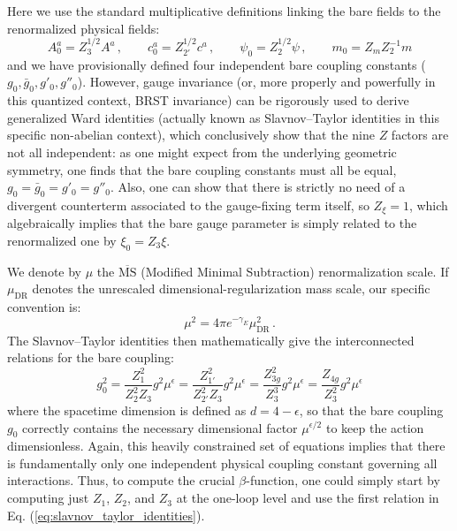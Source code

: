 Here we use the standard multiplicative definitions linking the bare fields to the renormalized physical fields:
\begin{equation} \label{eq:renormalization_constants}
    A_0^a = Z_3^{1/2}A^a \, , \qquad c_0^a = Z_{2'}^{1/2}c^a \, , \qquad \psi_0 = Z_2^{1/2}\psi \, , \qquad m_0 = Z_m Z_2^{-1}m
\end{equation}
and we have provisionally defined four independent bare coupling constants ($g_0, \bar{g}_0, g'_0, g''_0$). However, gauge invariance (or, more properly and powerfully in this quantized context, BRST invariance) can be rigorously used to derive generalized Ward identities (actually known as Slavnov--Taylor identities in this specific non-abelian context), which conclusively show that the nine $Z$ factors are not all independent: as one might expect from the underlying geometric symmetry, one finds that the bare coupling constants must all be equal, $g_0 = \bar{g}_0 = g'_0 = g''_0$. Also, one can show that there is strictly no need of a divergent counterterm associated to the gauge-fixing term itself, so $Z_\xi = 1$, which algebraically implies that the bare gauge parameter is simply related to the renormalized one by $\xi_0 = Z_3\xi$.

We denote by $\mu$ the $\overline{\text{MS}}$ (Modified Minimal Subtraction) renormalization scale. If $\mu_{\text{DR}}$ denotes the unrescaled dimensional-regularization mass scale, our specific convention is:
\begin{equation} \label{eq:ms_bar_scale}
    \mu^2 = 4\pi e^{-\gamma_E} \mu_{\text{DR}}^2 \, .
\end{equation}
The Slavnov--Taylor identities then mathematically give the interconnected relations for the bare coupling:
\begin{equation} \label{eq:slavnov_taylor_identities}
    g_0^2 = \frac{Z_1^2}{Z_2^2 Z_3}g^2\mu^\epsilon = \frac{Z_{1'}^2}{Z_{2'}^2 Z_3}g^2\mu^\epsilon = \frac{Z_{3g}^2}{Z_3^3}g^2\mu^\epsilon = \frac{Z_{4g}}{Z_3^2}g^2\mu^\epsilon
\end{equation}
where the spacetime dimension is defined as $d = 4 - \epsilon$, so that the bare coupling $g_0$ correctly contains the necessary dimensional factor $\mu^{\epsilon/2}$ to keep the action dimensionless. Again, this heavily constrained set of equations implies that there is fundamentally only one independent physical coupling constant governing all interactions. Thus, to compute the crucial $\beta$-function, one could simply start by computing just $Z_1$, $Z_2$, and $Z_3$ at the one-loop level and use the first relation in Eq. (\ref{eq:slavnov_taylor_identities}).

